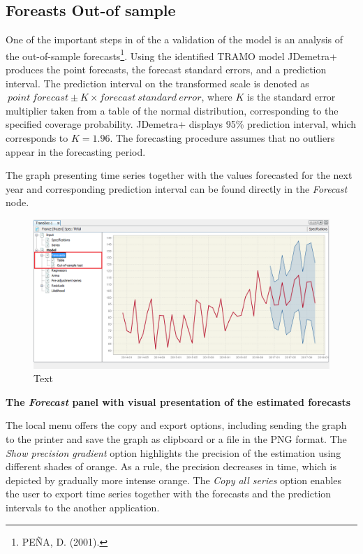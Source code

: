 \documentclass[
  letterpaper,
  DIV=11,
  numbers=noendperiod]{scrreprt}
\begin{document}
\hypertarget{foreasts-out-of-sample}{%
\subsection{Foreasts Out-of sample}\label{foreasts-out-of-sample}}

One of the important steps in of the a validation of the model is an
analysis of the out-of-sample forecasts\footnote{PEÑA, D. (2001).}.
Using the identified TRAMO model JDemetra+ produces the point forecasts,
the forecast standard errors, and a prediction interval. The prediction
interval on the transformed scale is denoted
as\(\ point\ forecast \pm K \times forecast\ standard\ error\), where
\(K\) is the standard error multiplier taken from a table of the normal
distribution, corresponding to the specified coverage probability.
JDemetra+ displays 95\% prediction interval, which corresponds to
\(K = 1.96.\) The forecasting procedure assumes that no outliers appear
in the forecasting period.

The graph presenting time series together with the values forecasted for
the next year and corresponding prediction interval can be found
directly in the \emph{Forecast} node.

\begin{figure}

{\centering \includegraphics{./All_images/image41_RMSB.png}

}

\caption{Text}

\end{figure}

\textbf{The \emph{Forecast} panel with visual presentation of the
estimated forecasts}

The local menu offers the copy and export options, including sending the
graph to the printer and save the graph as clipboard or a file in the
PNG format. The \emph{Show precision gradient} option highlights the
precision of the estimation using different shades of orange. As a rule,
the precision decreases in time, which is depicted by gradually more
intense orange. The \emph{Copy all series} option enables the user to
export time series together with the forecasts and the prediction
intervals to the another application.
\end{document}
